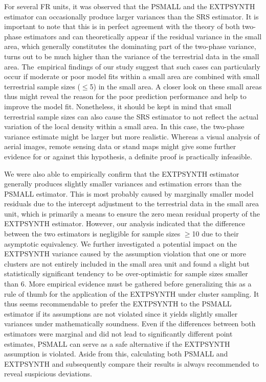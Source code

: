 \documentclass[remotesensing,article,accept,moreauthors,pdftex,10pt,a4paper]{Definitions/mdpi}
\newcommand{\psmall}{PSMALL}
\newcommand{\extpsynth}{EXTPSYNTH}
\begin{document}
For several FR units, it was observed that the \psmall{} and the \extpsynth{} estimator can occasionally produce larger variances than the SRS estimator. It is important to note that this is in perfect agreement with the theory of both two-phase estimators and can theoretically appear if the residual variance in the small area, which generally constitutes the dominating part of the two-phase variance, turns out to be much higher than the variance of the terrestrial data in the small area. The~empirical findings of our study suggest that such cases can particularly occur if moderate or poor model fits within a small area are combined with small terrestrial sample sizes ($\leq$5) in the small area. A closer look on these small areas thus might reveal the reason for the poor prediction performance and help to improve the model fit. Nonetheless, it should be kept in mind that small terrestrial sample sizes can also cause the SRS estimator to not reflect the actual variation of the local density within a small area. In this case, the two-phase variance estimate might be larger but more realistic. Whereas a visual analysis of aerial images, remote sensing data or stand maps might give some further evidence for or against this hypothesis, a definite proof is practically infeasible.\par

We were also able to empirically confirm that the \extpsynth{} estimator generally produces slightly smaller variances and estimation errors than the \psmall{} estimator. This is most probably caused by marginally smaller model residuals due to the intercept adjustment to the terrestrial data in the small area unit, which is primarily a means to ensure the zero mean residual property of the \extpsynth{} estimator. However, our analysis indicated that the difference between the two estimators is negligible for sample sizes $\geq$10 due to their asymptotic equivalency. We further investigated a potential impact on the \extpsynth{} variance caused by the assumption violation that one or more clusters are not entirely included in the small area unit and found a slight but statistically significant tendency to be over-optimistic for sample sizes smaller than 6. More empirical evidence must be gathered before generalizing this as a rule of thumb for the application of the \extpsynth{} under cluster sampling. It thus seems recommendable to prefer the \extpsynth{} to the \psmall{} estimator if its assumptions are not violated since it yields slightly smaller variances under mathematically soundness. Even if the differences between both estimators were marginal and did not lead to significantly different point estimates, \psmall{} can serve as a safe alternative if the \extpsynth{} assumption is violated. Aside from this, calculating both \psmall{} and \extpsynth{} and subsequently compare their results is always recommended to reveal suspicious deviations.\par
\end{document}
